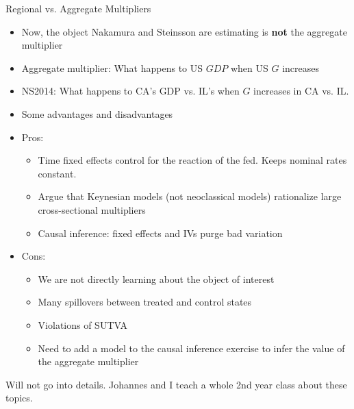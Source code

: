 \documentclass[11pt,aspectratio=169,xcolor={dvipsnames},hyperref={pdftex,pdfpagemode=UseNone,hidelinks,pdfdisplaydoctitle=true},usepdftitle=false]{beamer}
\begin{document}
\begin{frame}{Regional vs. Aggregate Multipliers}
\begin{itemize}
\item Now, the object Nakamura and Steinsson are estimating is \textbf{not} the aggregate multiplier
\item Aggregate multiplier: What happens to US $GDP$ when US $G$ increases
\item NS2014: What happens to CA's GDP vs. IL's when $G$ increases in CA vs. IL.
\item Some advantages and disadvantages
\item Pros:
\begin{itemize}
\item Time fixed effects control for the reaction of the fed. Keeps nominal rates constant.
\item Argue that Keynesian models (not neoclassical models)  rationalize large cross-sectional multipliers
\item Causal inference: fixed effects and IVs purge bad variation
\end{itemize}
\item Cons:
\begin{itemize}
\item We are not directly learning about the object of interest
\item Many spillovers between treated and control states
\item Violations of SUTVA
\item Need to add a model to the causal inference exercise to infer the value of the aggregate multiplier
\end{itemize}
\end{itemize}
Will not go into details. Johannes and I teach a whole 2nd year class about these topics. 
\end{frame}
\end{document}
